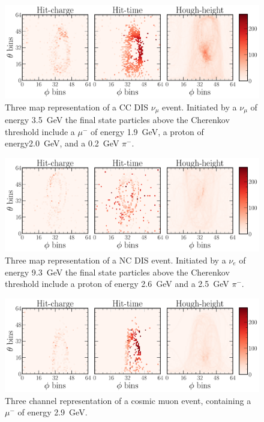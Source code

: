 \begin{figure} %
    \includegraphics[width=\textwidth]{diagrams/7-results/explore_numu_ccdis_event.pdf}
    \caption[Example of a CC DIS $\nu_{\mu}$ event]
    {Three map representation of a CC DIS $\nu_{\mu}$ event. Initiated by a $\nu_{\mu}$ of energy
        \SI{3.5}{\GeV} the final state particles above the Cherenkov threshold include a $\mu^{-}$
        of energy \SI{1.9}{\GeV}, a proton of energy\SI{2.0}{\GeV}, and a \SI{0.2}{\GeV}
        $\pi^{-}$.}
    \label{fig:explore_numu_ccdis_event}
\end{figure}

\begin{figure} %
    \includegraphics[width=\textwidth]{diagrams/7-results/explore_nuel_ncdis_event.pdf}
    \caption[Example of a NC DIS event]
    {Three map representation of a NC DIS event. Initiated by a $\nu_{e}$ of energy \SI{9.3}{GeV}
        the final state particles above the Cherenkov threshold include a proton of energy
        \SI{2.6}{\GeV} and a \SI{2.5}{\GeV} $\pi^{-}$.}
    \label{fig:explore_nuel_ncdis_event}
\end{figure}

\begin{figure} %
    \includegraphics[width=\textwidth]{diagrams/7-results/explore_cosmic_event.pdf}
    \caption[Example of a cosmic muon event]
    {Three channel representation of a cosmic muon event, containing a $\mu^{-}$ of energy
        \SI{2.9}{\GeV}.}
    \label{fig:explore_cosmic_event}
\end{figure}

